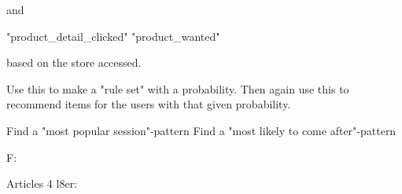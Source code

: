 and

"product\_detail\_clicked" \Rightarrow "product\_wanted"

based on the store accessed.

Use this to make a "rule set" with a probability.
Then again use this to recommend items for the users with that given probability.

Find a "most popular session"-pattern
Find a "most likely to come after"-pattern



F:


Articles 4 l8er:









